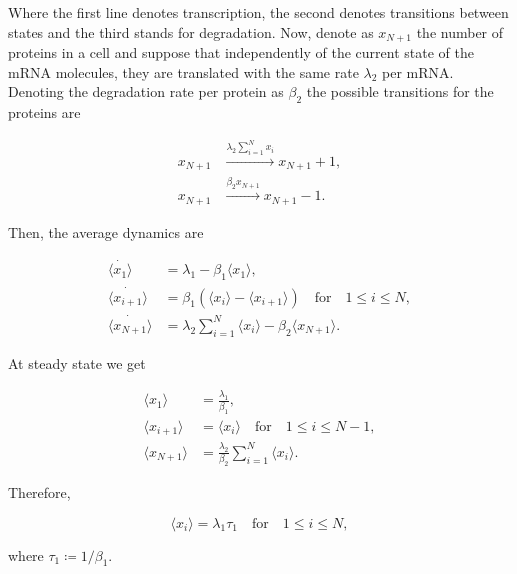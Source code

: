 Where the first line denotes transcription, the second denotes transitions between states and the third stands for degradation. Now, denote as $x_{N+1}$ the number of proteins in a cell and suppose that independently of the current state of the mRNA molecules, they are translated with the same rate $\lambda_2$ per mRNA. Denoting the degradation rate per protein as $\beta_2$ the possible transitions for the proteins are

\begin{equation}
  \begin{split}
    x_{N+1} &\xrightarrow{\lambda_2\sum_{i=1}^Nx_i} x_{N+1}+1,\\
    x_{N+1} &\xrightarrow{\beta_2x_{N+1}}x_{N+1}-1.
  \end{split}
\end{equation}

Then, the average dynamics are

\begin{equation}
  \begin{split}
    \dot{\langle x_1\rangle} &= \lambda_1 -\beta_1\langle x_1\rangle,\\
    \dot{\langle x_{i+1}\rangle} &= \beta_1\left(\langle x_i\rangle - \langle x_{i+1}\rangle\right)\quad\text{for}\quad 1\leq i\leq N,\\
    \dot{\langle x_{N+1}\rangle} &= \lambda_2\sum_{i=1}^N\langle x_i\rangle-\beta_2\langle x_{N+1}\rangle.
  \end{split}
\end{equation}

At steady state we get

\begin{equation}
  \begin{split}
    \langle x_1\rangle &= \frac{\lambda_1}{\beta_1},\\
    \langle x_{i+1}\rangle &= \langle x_i\rangle\quad\text{for}\quad 1\leq i\leq N-1,\\
    \langle x_{N+1}\rangle &= \frac{\lambda_2}{\beta_2}\sum_{i=1}^N\langle x_i\rangle.
  \end{split}
\end{equation}

Therefore,

\begin{equation}
  \langle x_i\rangle = \lambda_1\tau_1\quad\text{for}\quad 1\leq i\leq N,
\end{equation}

where $\tau_1 \coloneqq 1/\beta_1$.

